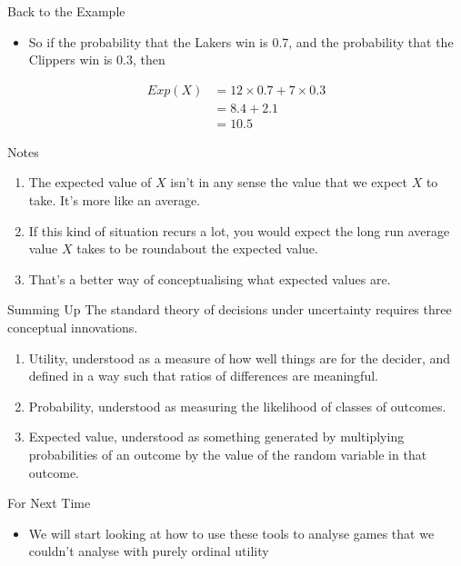 \documentclass[
  ignorenonframetext,
]{beamer}
\providecommand{\tightlist}{%
  \setlength{\itemsep}{0pt}\setlength{\parskip}{0pt}}
\begin{document}
\begin{frame}{Back to the Example}
\protect\hypertarget{back-to-the-example}{}
\begin{itemize}
\tightlist
\item
  So if the probability that the Lakers win is 0.7, and the probability
  that the Clippers win is 0.3, then
\end{itemize}

\begin{align*}
Exp(X) &= 12 \times 0.7 + 7 \times 0.3 \\
 &= 8.4 + 2.1 \\
 &= 10.5
\end{align*}
\end{frame}

\begin{frame}{Notes}
\protect\hypertarget{notes}{}
\begin{enumerate}
\tightlist
\item
  The expected value of \(X\) isn't in any sense the value that we
  expect \(X\) to take. It's more like an average.
\item
  If this kind of situation recurs a lot, you would expect the long run
  average value \(X\) takes to be roundabout the expected value.
\item
  That's a better way of conceptualising what expected values are.
\end{enumerate}
\end{frame}

\begin{frame}{Summing Up}
\protect\hypertarget{summing-up}{}
The standard theory of decisions under uncertainty requires three
conceptual innovations.

\begin{enumerate}
\tightlist
\item
  Utility, understood as a measure of how well things are for the
  decider, and defined in a way such that ratios of differences are
  meaningful.
\item
  Probability, understood as measuring the likelihood of classes of
  outcomes.
\item
  Expected value, understood as something generated by multiplying
  probabilities of an outcome by the value of the random variable in
  that outcome.
\end{enumerate}
\end{frame}

\begin{frame}{For Next Time}
\protect\hypertarget{for-next-time}{}
\begin{itemize}
\tightlist
\item
  We will start looking at how to use these tools to analyse games that
  we couldn't analyse with purely ordinal utility
\end{itemize}
\end{frame}
\end{document}
